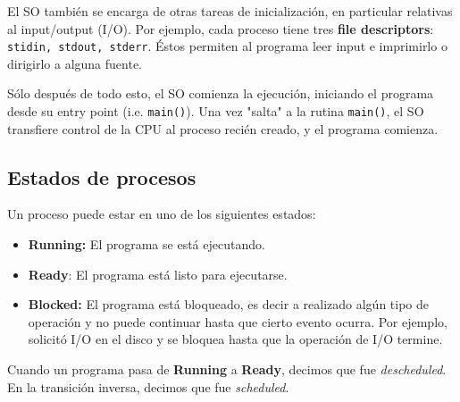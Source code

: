 \documentclass[12pt]{article}
\theoremstyle{definition}
\begin{document}
El SO también se encarga de otras tareas de inicialización, en particular
relativas al input/output (I/O). Por ejemplo, cada proceso tiene tres
\textbf{file descriptors}: \texttt{stidin, stdout, stderr}. Éstos permiten al
programa leer input e imprimirlo o dirigirlo a alguna fuente.

Sólo después de todo esto, el SO comienza la ejecución, iniciando el programa
desde su entry point (i.e. \texttt{main()}). Una vez "salta" a la rutina
\texttt{main()}, el SO transfiere control de la CPU al proceso recién creado, y
el programa comienza.

\subsection{Estados de procesos}

Un proceso puede estar en uno de los siguientes estados: 

\begin{itemize}
    \item \textbf{Running:} El programa se está ejecutando.
    \item \textbf{Ready}: El programa está listo para ejecutarse.
\item \textbf{Blocked:} El programa está bloqueado, es decir a realizado algún
    tipo de operación y no puede continuar hasta que cierto evento ocurra. Por
    ejemplo, solicitó I/O en el disco y se bloquea hasta que la operación de I/O
    termine.
\end{itemize}

Cuando un programa pasa de \textbf{Running} a \textbf{Ready}, decimos que fue 
\textit{descheduled}. En la transición inversa, decimos que fue
\textit{scheduled}.

\end{document}
